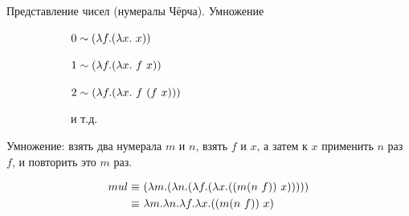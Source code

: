 \begin{frame}{Представление чисел (нумералы Чёрча). Умножение}
\begin{figure}[t]
    \begin{subfigure}[t]{0.45\textwidth}
$ 0 \sim (\lambda f . (\lambda x . \ x))$

$ 1 \sim (\lambda f . (\lambda x . \ f\ x))$

$ 2 \sim (\lambda f . (\lambda x . \ f\ (f\ x)))$

  и т.д.
    \end{subfigure}
    \begin{subfigure}[t]{0.45\textwidth}
    \begin{minipage}{\textwidth}
    \numeralIsFor
    \end{minipage}
    \end{subfigure}
\end{figure}

  \vspace{1cm}


Умножение: взять два нумерала $m$ и $n$, взять $f$ и $x$, а затем к $x$ применить $n$ раз $f$, и повторить это $m$ раз.

\begin{align*}
mul \equiv &\ (\lambda m . (\lambda n . (\lambda f . (\lambda x . ((m (n\ f )){\ x} )))))\\
\equiv &\ \lambda m. \lambda n. \lambda f. \lambda x. ((m (n\ f )) \ x) \\
\end{align*}
\end{frame}




